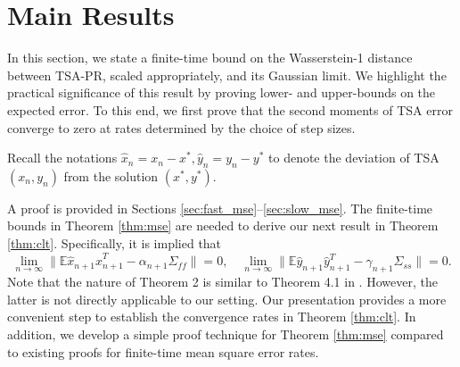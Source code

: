 \section{Main Results}
In this section, we state a finite-time bound on the Wasserstein-1 distance between TSA-PR, scaled appropriately, and its Gaussian limit. 
We highlight the practical significance of this result by proving lower- and upper-bounds on the expected error. 
To this end, we first prove that the second moments of TSA error converge to zero at rates determined by the choice of step sizes. 


Recall the notations $\hat{x}_n = x_n - x^*, \hat{y}_n = y_n - y^*$ to denote the deviation of TSA $(x_n, y_n)$ from the solution $(x^*,y^*)$.
\begin{theorem}\label{thm:mse}
    \MSE
\end{theorem}
A proof is provided in Sections \ref{sec:fast_mse}--\ref{sec:slow_mse}.
The finite-time bounds in Theorem \ref{thm:mse} are needed to derive our next result in Theorem \ref{thm:clt}. 
Specifically, it is implied that
\begin{equation}\label{eq:lbub_mse}
    \lim_{n\to \infty} \lVert \mathbb{E}\hat{x}_{n+1} \hat{x}_{n+1}^T - \alpha_{n+1} \Sigma_{ff} \rVert = 0 , 
    \quad
    \lim_{n \to \infty} \lVert \mathbb{E}\hat{y}_{n+1} \hat{y}_{n+1}^T - \gamma_{n+1} \Sigma_{ss} \rVert = 0 .
\end{equation}
Note that the nature of Theorem 2 is similar to Theorem 4.1 in \citep{haque2023tightfinitetimebounds}. 
However, the latter is not directly applicable to our setting.
Our presentation provides a more convenient step to establish the convergence rates in Theorem \ref{thm:clt}. 
In addition, we develop a simple proof technique for Theorem \ref{thm:mse} compared to existing proofs for finite-time mean square error rates. 




